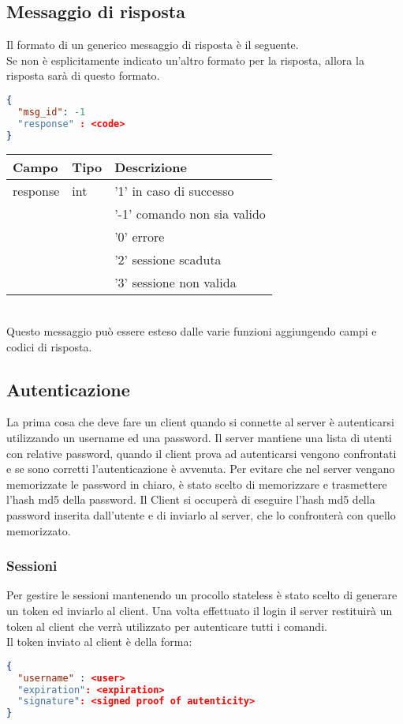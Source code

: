 \subsection{Messaggio di risposta}
Il formato di un generico messaggio di risposta è il seguente.\\
Se non è esplicitamente indicato un'altro formato per la risposta,
 allora la risposta sarà di questo formato.
\begin{lstlisting}[language=json]
{
  "msg_id": -1
  "response" : <code>
}
\end{lstlisting}

\begin{tabular}{|l | l | l |}
\hline
Campo & Tipo & Descrizione \\ \hline
response & int & '1' in caso di successo  \\
& & '-1' comando non sia valido \\
& & '0' errore \\
& & '2' sessione scaduta \\
& & '3' sessione non valida \\ \hline
\end{tabular}\\
Questo messaggio può essere esteso dalle varie funzioni aggiungendo campi e codici di risposta.\\

\subsection{Autenticazione}
La prima cosa che deve fare un client quando si connette al server è autenticarsi utilizzando un username ed una password.
Il server mantiene una lista di utenti con relative password, quando il client prova ad autenticarsi vengono confrontati e se sono corretti l'autenticazione è avvenuta.
Per evitare che nel server vengano memorizzate le password in chiaro, è stato scelto di memorizzare e trasmettere l'hash md5 della password.
Il Client si occuperà di eseguire l'hash md5 della password inserita dall'utente e di inviarlo al server, che lo confronterà con quello memorizzato.\\

\subsubsection{Sessioni}
Per gestire le sessioni  mantenendo un procollo stateless è stato scelto di generare un token ed inviarlo al client.
Una volta effettuato il login il server restituirà un token al client che verrà utilizzato per autenticare tutti i comandi.\\
Il token inviato al client è della forma:
\begin{lstlisting}[language=json]
{
  "username" : <user>
  "expiration": <expiration>
  "signature": <signed proof of autenticity>
}
\end{lstlisting}

